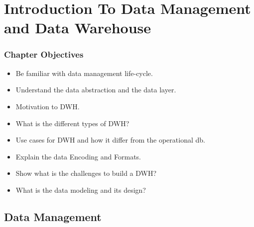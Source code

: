 \section{Introduction To Data Management and Data Warehouse}


\begin{frame}
\frametitle{Chapter Objectives}

\begin{itemize}[<+->]
        \item Be familiar with data management life-cycle.
        \item Understand the data abstraction and the data layer.
        \item Motivation to DWH.
        \item What is the different types of DWH?
	\item Use cases for DWH and how it differ from the operational db.
	\item Explain the data Encoding and Formats.
	\item Show what is the challenges to build a DWH?
	\item What is the data modeling and its design?
\end{itemize}

\end{frame}


\subsection{Data Management}

